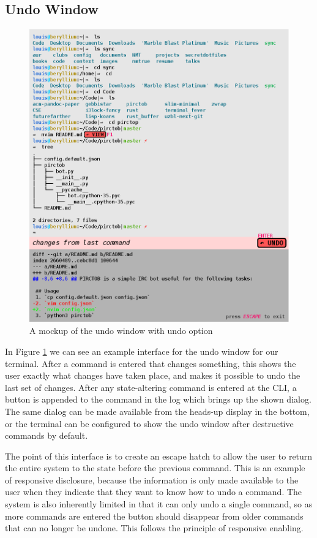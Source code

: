 \subsection{Undo Window}

\begin{figure}[H]
  \centering
  \includegraphics[width=0.8\linewidth]{figures/interface/undo.eps}
  \caption{A mockup of the undo window with undo option}
  \label{fig:undo}
\end{figure}

In Figure \ref{fig:undo} we can see an example interface for the undo window for
our terminal. After a command is entered that changes something, this shows the
user exactly what changes have taken place, and makes it possible to undo the
last set of changes. After any state-altering command is entered at the CLI, a
button is appended to the command in the log which brings up the shown
dialog. The same dialog can be made available from the heads-up display in the
bottom, or the terminal can be configured to show the undo window after
destructive commands by default.

The point of this interface is to create an escape hatch to allow the user to
return the entire system to the state before the previous command. This is an
example of responsive disclosure, because the information is only made available
to the user when they indicate that they want to know how to undo a command. The
system is also inherently limited in that it can only undo a single command, so
as more commands are entered the button should disappear from older commands
that can no longer be undone. This follows the principle of responsive enabling.

